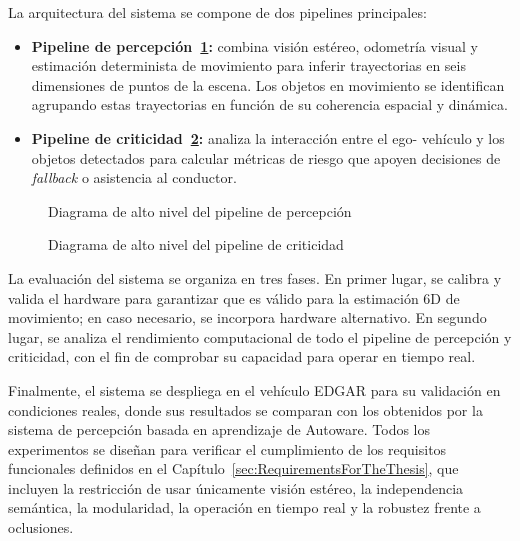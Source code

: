 La arquitectura del sistema se compone de dos pipelines principales:

\begin{itemize}
  \item \textbf{Pipeline de percepción~\ref{fig:perception_high_level}:} combina visión estéreo, odometría
  visual y estimación determinista de movimiento para inferir trayectorias en
  seis dimensiones de puntos de la escena. Los objetos en movimiento se
  identifican agrupando estas trayectorias en función de su coherencia espacial
  y dinámica.

  \item \textbf{Pipeline de criticidad~\ref{fig:criticality_high_level}:} analiza la interacción entre el ego-
  vehículo y los objetos detectados para calcular métricas de riesgo que
  apoyen decisiones de \textit{fallback} o asistencia al conductor.
\end{itemize}

\begin{figure}[H]
  \centering
  \resizebox{0.8\textwidth}{!}{}
  \caption{Diagrama de alto nivel del pipeline de percepción}\label{fig:perception_high_level}
\end{figure}%


\begin{figure}[H]
  \centering
  \resizebox{0.2\textwidth}{!}{}
  \caption{Diagrama de alto nivel del pipeline de criticidad}\label{fig:criticality_high_level}
\end{figure}%

La evaluación del sistema se organiza en tres fases. En primer lugar, se calibra
y valida el hardware para garantizar que es válido para la estimación 6D de
movimiento; en caso necesario, se incorpora hardware alternativo. En segundo
lugar, se analiza el rendimiento computacional de todo el pipeline de percepción
y criticidad, con el fin de comprobar su capacidad para operar en tiempo real.


Finalmente, el sistema se despliega en el vehículo EDGAR para su validación en
condiciones reales, donde sus resultados se comparan con los obtenidos por la
sistema de percepción basada en aprendizaje de Autoware. Todos los experimentos se
diseñan para verificar el cumplimiento de los requisitos funcionales definidos en
el Capítulo~\ref{sec:RequirementsForTheThesis}, que incluyen la restricción de
usar únicamente visión estéreo, la independencia semántica, la modularidad, la
operación en tiempo real y la robustez frente a oclusiones.

